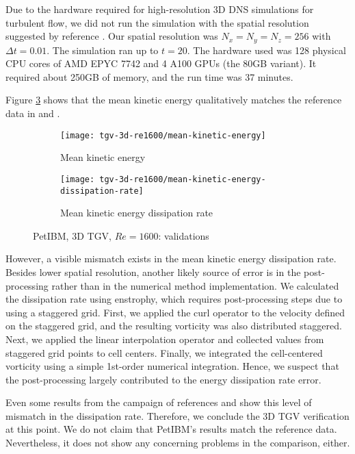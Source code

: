 Due to the hardware required for high-resolution 3D DNS simulations for turbulent flow, we did not run the simulation with the spatial resolution suggested by reference \cite{noauthor_1st_2012}.
Our spatial resolution was $N_x=N_y=N_z=256$ with $\Delta t=0.01$.
The simulation ran up to $t=20$.
The hardware used was 128 physical CPU cores of AMD EPYC 7742 and 4 A100 GPUs (the 80GB variant).
It required about 250GB of memory, and the run time was 37 minutes.

Figure \ref{fig:petibm-tgv3d-re1600-val} shows that the mean kinetic energy qualitatively matches the reference data in \cite{noauthor_1st_2012} and \cite{debonis_solutions_2013}.
\begin{figure}[hbt!]
    \centering
    \begin{subfigure}[b]{0.45\textwidth}
        \centering
        \texttt{[image: tgv-3d-re1600/mean-kinetic-energy]}
        \caption{Mean kinetic energy}
        \label{fig:petibm-tgv3d-re1600-mean-energy}
    \end{subfigure}
    \hfill
    \begin{subfigure}[b]{0.45\textwidth}
        \centering
        \texttt{[image: tgv-3d-re1600/mean-kinetic-energy-dissipation-rate]}
        \caption{Mean kinetic energy dissipation rate}
        \label{fig:petibm-tgv3d-re1600-mean-energy-dissp}
    \end{subfigure}
    \caption{PetIBM, 3D TGV, $Re=1600$: validations}
    \label{fig:petibm-tgv3d-re1600-val}
\end{figure}
However, a visible mismatch exists in the mean kinetic energy dissipation rate.
Besides lower spatial resolution, another likely source of error is in the post-processing rather than in the numerical method implementation.
We calculated the dissipation rate using enstrophy, which requires post-processing steps due to using a staggered grid.
First, we applied the curl operator to the velocity defined on the staggered grid, and the resulting vorticity was also distributed staggered.
Next, we applied the linear interpolation operator and collected values from staggered grid points to cell centers.
Finally, we integrated the cell-centered vorticity using a simple 1st-order numerical integration.
Hence, we suspect that the post-processing largely contributed to the energy dissipation rate error.

Even some results from the campaign of references \cite{noauthor_1st_2012} and \cite{debonis_solutions_2013} show this level of mismatch in the dissipation rate.
Therefore, we conclude the 3D TGV verification at this point.
We do not claim that PetIBM's results match the reference data.
Nevertheless, it does not show any concerning problems in the comparison, either.


